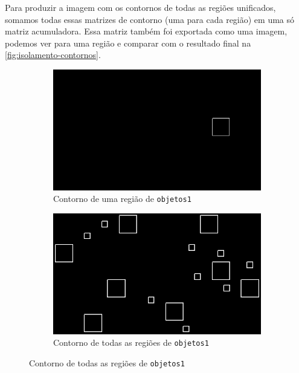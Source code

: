 \documentclass[brazilian,a4paper,twocolumn]{article}
\begin{document}
        Para produzir a imagem com os contornos de todas as regiões unificados, somamos todas essas matrizes de contorno (uma para cada região) em uma só matriz acumuladora. Essa matriz também foi exportada como uma imagem, podemos ver para uma região e comparar com o resultado final na \cref{fig:isolamento-contornos}.

        \begin{figure}[H]
            \centering

            \begin{subfigure}{0.23\textwidth}
                \includegraphics[width=\textwidth,keepaspectratio]{contornos/objetos1-region-9-contornos}
                \caption{Contorno de uma região de \texttt{objetos1}}
                \label{fig:objetos1-contorno-isolado}
            \end{subfigure}
            \hfill
            \begin{subfigure}{0.23\textwidth}
                \includegraphics[width=\textwidth,keepaspectratio]{objetos1-contorno}
                \caption{Contorno de todas as regiões de \texttt{objetos1}}
                \label{fig:objetos1-contornos}
            \end{subfigure}


\end{figure}
\end{document}
